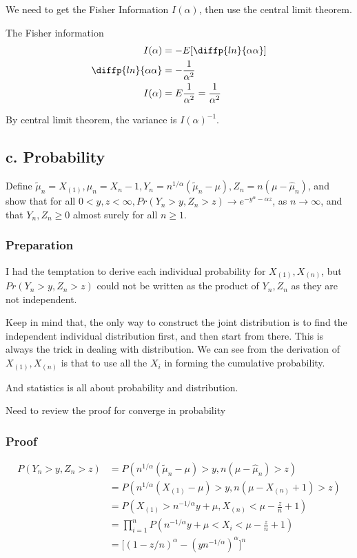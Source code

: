 	We need to get the Fisher Information $I(\alpha)$, then use the central limit theorem. 
	
	The Fisher information
	\begin{align*}
	I(\alpha)&= -E[\diffp{ln}{\alpha \alpha}]\\
	\diffp{ln}{\alpha \alpha} &= -\frac{1}{\alpha^2} \\
	I(\alpha)&= E\frac{1}{\alpha^2}= \frac{1}{\alpha^2} \\
\end{align*}	
	
By central limit theorem, the variance is $I(\alpha)^{-1}$. 


\subsection{c. Probability}	
Define $\tilde{\mu}_n = X_{(1)}, \hat{\mu}_n = X_{n}-1, Y_n = n^{1/\alpha} (\tilde{\mu}_n - \mu), Z_n = n(\mu- \hat{\mu}_n)$, and show that for all $0< y, z < \infty, Pr(Y_n > y, Z_n > z) \rightarrow e^{-y^{\alpha} -\alpha z}$, as $n \rightarrow \infty$, and that $Y_n, Z_n \geq 0$ almost surely for all $n \geq 1$.  

\subsubsection{Preparation}
I had the temptation to derive each individual probability for $X_{(1)}, X_{(n)}$, but $Pr(Y_n > y, Z_n > z)$ could not be written as the product of $Y_n, Z_n$ as they are not independent. 

Keep in mind that, the only way to construct the joint distribution is to find the independent individual distribution first, and then start from there. This is always the trick in dealing with distribution. We can see from the derivation of $X_{(1)}, X_{(n)}$ is that to use all the $X_i$ in forming the cumulative probability.

And statistics is all about probability and distribution.

Need to review the proof for converge in probability 


\subsubsection{Proof}
	\begin{align*}
		P(Y_n > y, Z_n >z) &= P( n^{1/\alpha} (\tilde{\mu}_n - \mu) > y,   n(\mu - \hat{\mu}_n) > z)\\
		&= P( n^{1/\alpha} (X_{(1)} - \mu) > y,   n(\mu - X_{(n)} + 1) > z)\\
		&= P(X_{(1)} > n^{-1/\alpha} y + \mu, X_{(n)} < \mu - \frac{z}{n} + 1)\\
		&=  \prod_{i=1}^n P( n^{-1/\alpha} y + \mu < X_i < \mu - \frac{z}{n} + 1) \\
		&= \Bigg[ (1- z/n)^{\alpha} - (yn^{-1/\alpha})^{\alpha} \Bigg]^n
	\end{align*} 

